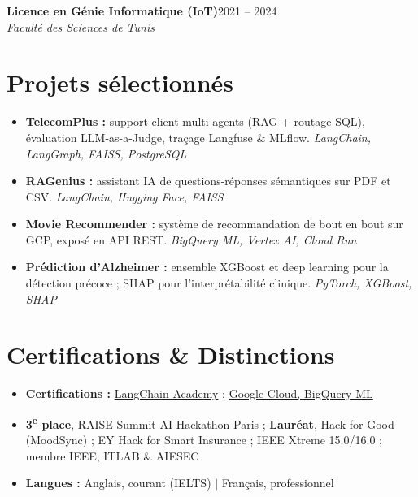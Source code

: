 \documentclass[9.5pt,a4paper]{article}
\newcommand{\jobtitle}[3]{\textbf{#1}\hfill{\small #2}\\[1pt]\textit{#3}}
\begin{document}
\vspace{1.8mm}
\jobtitle{Licence en G\'enie Informatique (IoT)}{2021 -- 2024}{Facult\'e des Sciences de Tunis}

\section*{Projets s\'electionn\'es}
\begin{itemize}
\item \textbf{TelecomPlus :} support client multi-agents (RAG + routage SQL), \'evaluation LLM-as-a-Judge, tra\c{c}age Langfuse \& MLflow. \textit{LangChain, LangGraph, FAISS, PostgreSQL}
\item \textbf{RAGenius :} assistant IA de questions-r\'eponses s\'emantiques sur PDF et CSV. \textit{LangChain, Hugging Face, FAISS}
\item \textbf{Movie Recommender :} syst\`eme de recommandation de bout en bout sur GCP, expos\'e en API REST. \textit{BigQuery ML, Vertex AI, Cloud Run}
\item \textbf{Pr\'ediction d'Alzheimer :} ensemble XGBoost et deep learning pour la d\'etection pr\'ecoce ; SHAP pour l'interpr\'etabilit\'e clinique. \textit{PyTorch, XGBoost, SHAP}
\end{itemize}

\section*{Certifications \& Distinctions}
\begin{itemize}
\item \textbf{Certifications :} \href{https://academy.langchain.com/certificates/nqrsewnhol}{LangChain Academy} ; \href{https://www.credly.com/badges/9ec1dc8b-494f-42ee-a314-ba30b40342de/public_url}{Google Cloud, BigQuery ML}
\item \textbf{3\textsuperscript{e} place}, RAISE Summit AI Hackathon Paris ; \textbf{Laur\'eat}, Hack for Good (MoodSync) ; EY Hack for Smart Insurance ; IEEE Xtreme 15.0/16.0 ; membre IEEE, ITLAB \& AIESEC
\item \textbf{Langues :} Anglais, courant (IELTS) $\vert$ Fran\c{c}ais, professionnel
\end{itemize}
\end{document}
